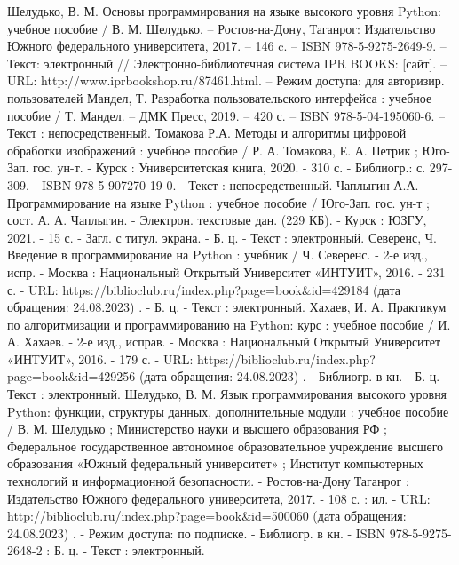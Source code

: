 
\begin{thebibliography}{9}

	Шелудько, В. М. Основы программирования на языке высокого уровня Python: учебное пособие / В. М. Шелудько. – Ростов-на-Дону, Таганрог: Издательство Южного федерального университета, 2017. – 146 c. – ISBN 978-5-9275-2649-9. – Текст: электронный // Электронно-библиотечная система IPR BOOKS: [сайт]. – URL: http://www.iprbookshop.ru/87461.html. – Режим доступа: для авторизир. пользователей
     Мандел, Т. Разработка пользовательского интерфейса : учебное пособие / Т. Мандел. – ДМК Пресс, 2019. – 420 с. – ISBN 978-5-04-195060-6. – Текст : непосредственный.
     Томакова Р.А.  Методы и алгоритмы цифровой обработки изображений : учебное пособие / Р. А. Томакова, Е. А. Петрик ; Юго-Зап. гос. ун-т. - Курск : Университетская книга, 2020. - 310 с. - Библиогр.: с. 297-309. - ISBN 978-5-907270-19-0. - Текст : непосредственный.
     Чаплыгин А.А. Программирование на языке Python : учебное пособие / Юго-Зап. гос. ун-т ; сост. А. А. Чаплыгин. - Электрон. текстовые дан. (229 КБ). - Курск : ЮЗГУ, 2021. - 15 с. - Загл. с титул. экрана. - Б. ц. - Текст : электронный.
     Северенс, Ч.   Введение в программирование на Python : учебник / Ч. Северенс. - 2-е изд., испр. - Москва : Национальный Открытый Университет «ИНТУИТ», 2016. - 231 с. - URL: https://biblioclub.ru/index.php?page=book\&id=429184 (дата обращения: 24.08.2023) . - Б. ц. - Текст : электронный.
	 Хахаев, И. А.   Практикум по алгоритмизации и программированию на Python: курс : учебное пособие / И. А. Хахаев. - 2-е изд., исправ. - Москва : Национальный Открытый Университет «ИНТУИТ», 2016. - 179 с. - URL: https://biblioclub.ru/index.php?page=book\&id=429256 (дата обращения: 24.08.2023) . - Библиогр. в кн. - Б. ц. - Текст : электронный.
	 Шелудько, В. М.  Язык программирования высокого уровня Python: функции, структуры данных, дополнительные модули : учебное пособие / В. М. Шелудько ; Министерство науки и высшего образования РФ ; Федеральное государственное автономное образовательное учреждение высшего образования «Южный федеральный университет» ; Институт компьютерных технологий и информационной безопасности. - Ростов-на-Дону|Таганрог : Издательство Южного федерального университета, 2017. - 108 с. : ил. - URL: http://biblioclub.ru/index.php?page=book\&id=500060 (дата обращения: 24.08.2023) . - Режим доступа: по подписке. - Библиогр. в кн. - ISBN 978-5-9275-2648-2 : Б. ц. - Текст : электронный.

\end{thebibliography}

